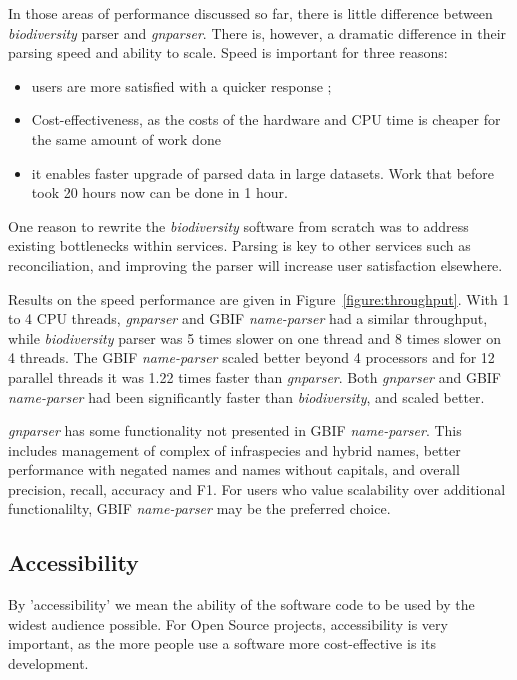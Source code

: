 \documentclass{bmcart}
\begin{document}
In those areas of performance discussed so far, there is little difference
between \textit{biodiversity} parser and \textit{gnparser}. There is, however,
a dramatic difference in their parsing speed and ability to scale. Speed is
important for three reasons:


\begin{itemize}

  \item users are more satisfied with a quicker response ;

  \item Cost-effectiveness, as the costs of the hardware and CPU time is
    cheaper for the same amount of work done

  \item it enables faster upgrade of parsed data in large datasets. Work that
    before took 20 hours now can be done in 1 hour.

\end{itemize}

One reason to rewrite the \textit{biodiversity} software from scratch was to
address existing bottlenecks within services. Parsing is key to other services
such as reconciliation, and improving the parser will increase user
satisfaction elsewhere.

Results on the speed performance are given in Figure~\ref{figure:throughput}.
With 1 to 4 CPU threads, \textit{gnparser} and GBIF \textit{name-parser} had a
similar throughput, while \textit{biodiversity} parser was 5 times slower on
one thread and  8 times slower on 4 threads. The GBIF \textit{name-parser}
scaled better beyond 4 processors and for 12 parallel threads it was 1.22 times
faster than \textit{gnparser}.  Both \textit{gnparser} and GBIF
\textit{name-parser} had been significantly faster than \textit{biodiversity},
and scaled better.

\textit{gnparser} has some functionality not presented in GBIF
\textit{name-parser}. This includes management of complex of infraspecies and
hybrid names, better performance with negated names and names without capitals,
and overall precision, recall, accuracy and F1.  For users who value
scalability over additional functionalilty, GBIF \textit{name-parser} may be
the preferred choice.

\subsection*{Accessibility}

By 'accessibility' we mean the ability of the software code to be used by the widest
audience possible. For Open Source projects, accessibility is very important,
as the more people use a software more cost-effective is its development.
\end{document}

